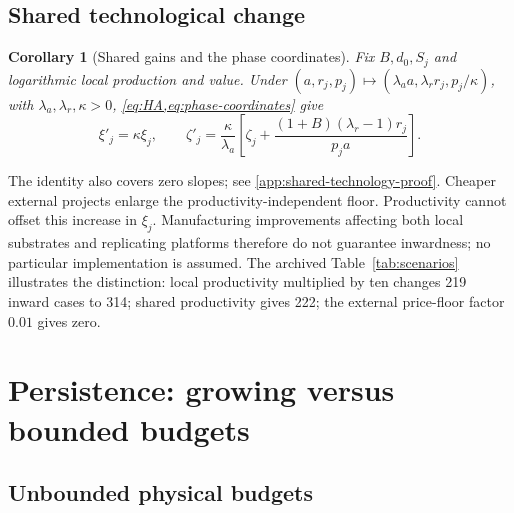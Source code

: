 \documentclass[11pt,a4paper]{article}
\newtheorem{corollary}[proposition]{Corollary}
\theoremstyle{definition}\newtheorem{definition}{Definition}
\begin{document}
\begin{samepage}
\subsection{Shared technological change}
\begin{corollary}[Shared gains and the phase coordinates]
\label{cor:shared-technology}
Fix $B,d_0,S_j$ and logarithmic local production and value. Under
$(a,r_j,p_j)\mapsto(\lambda_a a,\lambda_r r_j,p_j/\kappa)$, with
$\lambda_a,\lambda_r,\kappa>0$, \cref{eq:HA,eq:phase-coordinates} give
\begin{equation}
 \xi'_j=\kappa\xi_j,\qquad
 \zeta'_j=\frac{\kappa}{\lambda_a}
 \left[\zeta_j+\frac{(1+B)(\lambda_r-1)r_j}{p_ja}\right].
 \label{eq:shared-technology}
\end{equation}
\end{corollary}
\end{samepage}
The identity also covers zero slopes; see \cref{app:shared-technology-proof}.
Cheaper external projects enlarge the productivity-independent floor.
Productivity cannot offset this increase in $\xi_j$.
Manufacturing improvements affecting both local substrates and replicating
platforms therefore do not guarantee inwardness; no particular implementation
is assumed. The archived Table~\ref{tab:scenarios} illustrates the distinction:
local productivity multiplied by ten changes 219 inward cases to 314;
shared productivity gives 222; the external price-floor factor $0.01$ gives zero.

\section{Persistence: growing versus bounded budgets}
\label{sec:persistence}

\subsection{Unbounded physical budgets}
\end{document}
